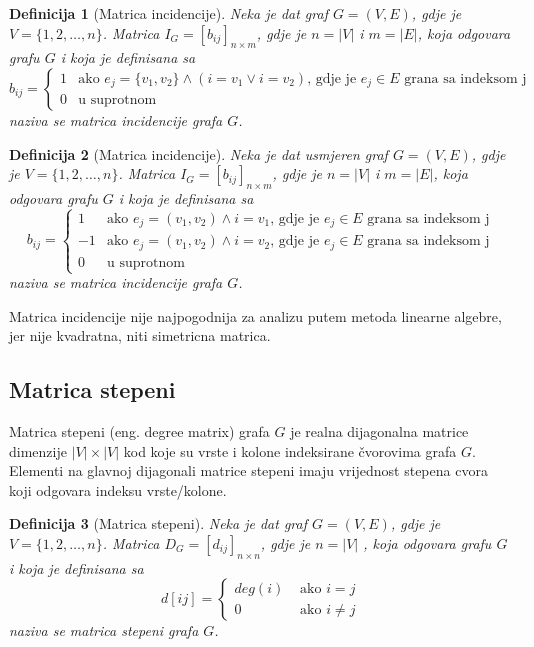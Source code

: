 \documentclass[11pt]{article}
\newtheorem{definition}{Definicija}
\begin{document}
			\begin{definition}[Matrica incidencije] 
			Neka je dat graf $G = (V, E)$, gdje je $V = \{1, 2, \dots, n\}$. Matrica $I_G = [b_{ij}]_{n \times m}$, gdje je $n = |V|$ i $m = |E|$, koja odgovara grafu $G$ i koja je definisana sa
			 \[
				 b_{ij} =
				 \begin{cases}
				 1 & \text{ako } e_j = \{v_1,v_2\} \land ( i = v_1 \lor i=v_2) \text{, gdje je } e_j \in E \text{ grana sa indeksom j} \\
				 0 & \text{u suprotnom}
				 \end{cases}
			 \]
			naziva se matrica incidencije grafa $G$.
			\end{definition}
	
			\begin{definition}[Matrica incidencije] 
			Neka je dat usmjeren graf $G = (V, E)$, gdje je $V = \{1, 2, \dots, n\}$. Matrica $I_G = [b_{ij}]_{n \times m}$, gdje je $n = |V|$ i $m = |E|$, koja odgovara grafu $G$ i koja je definisana sa
			 \[
				 b_{ij} =
				 \begin{cases}
				 1 & \text{ako } e_j = (v_1,v_2) \land i = v_1 \text{, gdje je } e_j \in E \text{ grana sa indeksom j} \\
				-1 & \text{ako } e_j = (v_1,v_2) \land i = v_2 \text{, gdje je } e_j \in E \text{ grana sa indeksom j} \\
				 0 & \text{u suprotnom}
				 \end{cases}
			 \]
			naziva se matrica incidencije grafa $G$.
			\end{definition}
	
	
			Matrica incidencije nije najpogodnija za analizu putem metoda linearne algebre, jer nije kvadratna, niti simetricna matrica.
	
		\subsection{Matrica stepeni}
		Matrica stepeni (eng. degree matrix) grafa $G$ je realna dijagonalna matrice dimenzije $|V| \times |V|$ kod koje su vrste i kolone indeksirane čvorovima grafa $G$.
		Elementi na glavnoj dijagonali matrice stepeni imaju vrijednost stepena cvora koji odgovara indeksu vrste/kolone. 
	
			\begin{definition}[Matrica stepeni] 
			Neka je dat graf $G = (V, E)$, gdje je $V = \{1, 2, \dots, n\}$. Matrica $D_G = [d_{ij}]_{n \times n}$, gdje je $n = |V|$ , koja odgovara grafu $G$ i koja je definisana sa
			\[
				d[ij] = 
				 \begin{cases}
				 deg(i) &  \text{ ako } i =j  \\ 
				 0  & \text{ ako } i \neq j 
				 \end{cases}
			\]
			naziva se matrica stepeni grafa $G$.
			\end{definition}
	
\end{document}
